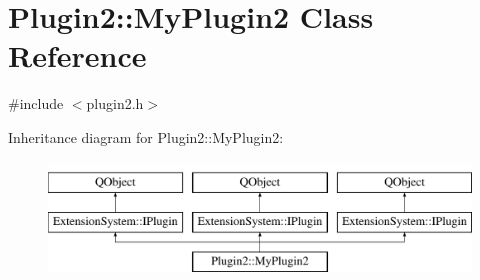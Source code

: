 \hypertarget{class_plugin2_1_1_my_plugin2}{\section{Plugin2\-:\-:My\-Plugin2 Class Reference}
\label{class_plugin2_1_1_my_plugin2}
}


{\ttfamily \#include $<$plugin2.\-h$>$}

Inheritance diagram for Plugin2\-:\-:My\-Plugin2\-:\begin{figure}[H]
\begin{center}
\leavevmode
\includegraphics[height=3.000000cm]{class_plugin2_1_1_my_plugin2}
\end{center}
\end{figure}
